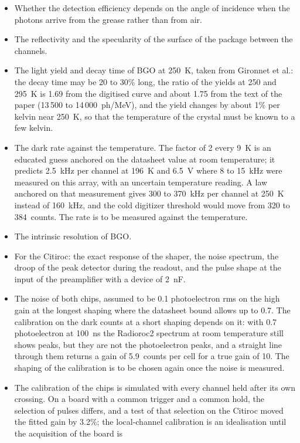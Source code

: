 \documentclass[11pt]{article}
\begin{document}
\begin{itemize}
\item Whether the detection efficiency depends on the angle of incidence
  when the photons arrive from the grease rather than from air.
\item The reflectivity and the specularity of the surface of the package
  between the channels.
\item The light yield and decay time of BGO at 250~K, taken from Gironnet
  et al.: the decay time may be 20 to 30\% long, the ratio of the yields
  at 250 and 295~K is 1.69 from the digitised curve and about 1.75 from
  the text of the paper (13\,500 to 14\,000~ph/MeV), and the yield changes by
  about 1\% per kelvin near 250~K, so that the temperature of the crystal
  must be known to a few kelvin.
\item The dark rate against the temperature. The factor of 2 every 9~K is
  an educated guess anchored on the datasheet value at room temperature;
  it predicts 2.5~kHz per channel at 196~K and 6.5~V where 8 to 15~kHz were
  measured on this array, with an uncertain temperature reading. A law
  anchored on that measurement gives 300 to 370~kHz per channel at 250~K
  instead of 160~kHz, and the cold digitizer threshold would move from 320
  to 384~counts. The rate is to be measured against the temperature.
\item The intrinsic resolution of BGO.
\item For the Citiroc: the exact response of the shaper, the noise
  spectrum, the droop of the peak detector during the readout, and the
  pulse shape at the input of the preamplifier with a device of 2~nF.
\item The noise of both chips, assumed to be 0.1 photoelectron rms on the
  high gain at the longest shaping where the datasheet bound allows up to
  0.7. The calibration on the dark counts at a short shaping depends on
  it: with 0.7 photoelectron at 100~ns the Radioroc2 spectrum at room
  temperature still shows peaks, but they are not the photoelectron peaks,
  and a straight line through them returns a gain of 5.9~counts per cell
  for a true gain of 10. The shaping of the calibration is to be chosen
  again once the noise is measured.
\item The calibration of the chips is simulated with every channel held
  after its own crossing. On a board with a common trigger and a common
  hold, the selection of pulses differs, and a test of that selection on
  the Citiroc moved the fitted gain by 3.2\%; the local-channel
  calibration is an idealisation until the acquisition of the board is

\end{itemize}
\end{document}
